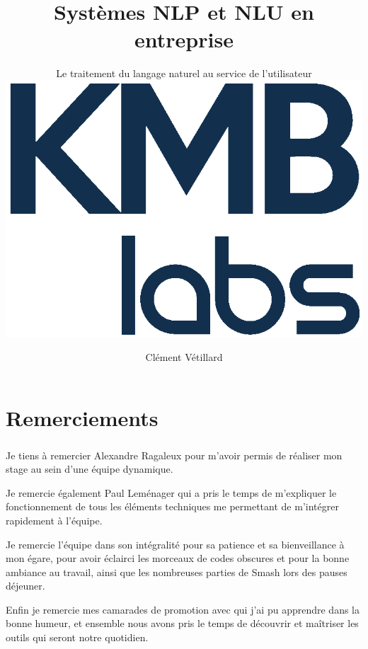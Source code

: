 \documentclass[12pt,a4paper,oneside]{scrreprt}
\title{Systèmes NLP et NLU en entreprise}
\subtitle{
Le traitement du langage naturel au service de l'utilisateur\\
	\vspace{0.3cm}
\includegraphics[scale=0.8]{pictures/kmb}
}
\author{Clément Vétillard}
\date{\vfill}
\begin{document}

\maketitle

\tableofcontents
\thispagestyle{empty}

\chapter*{Remerciements}
	\paragraph{}
	Je tiens à remercier Alexandre Ragaleux pour m'avoir permis de réaliser mon stage au sein d'une équipe dynamique.

	Je remercie également Paul Leménager qui a pris le temps de m'expliquer le fonctionnement de tous les éléments techniques me permettant de m'intégrer rapidement à l'équipe.

	Je remercie l'équipe dans son intégralité pour sa patience et sa bienveillance à mon égare, pour avoir éclairci les morceaux de codes obscures et pour la bonne ambiance au travail, ainsi que les nombreuses parties de Smash lors des pauses déjeuner.

	Enfin je remercie mes camarades de promotion avec qui j'ai pu apprendre dans la bonne humeur, et ensemble nous avons pris le temps de découvrir et maîtriser les outils qui seront notre quotidien.
\end{document}
